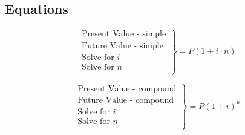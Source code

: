 \subsection{Equations}
\begin{equation*}
\left.\begin{array}{l}
\mbox{Present Value - simple}\\
\mbox{Future Value - simple} \\
\mbox{Solve for $i$}\\
\mbox{Solve for $n$}\\
\end{array}\right\}= P (1 + i \cdot n)
\end{equation*}

\begin{equation*}
\left.\begin{array}{l}
\mbox{Present Value - compound}\\
\mbox{Future Value - compound} \\
\mbox{Solve for $i$}\\
\mbox{Solve for $n$}\\
\end{array}\right\}= P (1+i)^n
\end{equation*}


